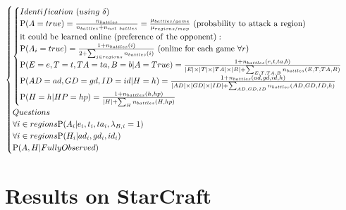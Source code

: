 \begin{eqnarray*}
\begin{cases}
\begin{cases}
    Identification\ (using\ \delta)\\
\PP(A=true)= \frac{n_{battles}}{n_{battles}+n_{not\ battles}} = \frac{\mu_{battles/game}}{\mu_{regions/map}}\ \mathrm{(probability\ to\ attack\ a\ region)}\\
\mathrm{it\ could\ be\ learned\ online\ (preference\ of\ the\ opponent):}\\
\PP(A_i=true) = \frac{1 + n_{battles}(i)}{2 + \sum_{j \in regions}n_{battles}(i)}\ \mathrm{(online\ for\ each\ game\ }\forall r\mathrm{)}\\
\PP(E=e,T=t,TA=ta,B=b|A=True) = \frac{1+n_{battles}(e,t,ta,b)}{\abs{E} \times \abs{T} \times \abs{TA} \times \abs{B} + \sum_{E,T,TA,B} n_{battles}(E,T,TA,B)} \\
\PP(AD=ad,GD=gd,ID=id|H=h) = \frac{1+n_{battles}(ad,gd,id,h)}{\abs{AD} \times \abs{GD} \times \abs{ID} + \sum_{AD,GD,ID} n_{battles}(AD,GD,ID,h)} \\
\PP(H=h|HP=hp) = \frac{1 + n_{battles}(h,hp)}{\abs{H} + \sum_{H} n_{battles}(H,hp)}\\
    \end{cases}\\
Questions\\
\forall i \in regions \PP(A_i|e_i,t_i,ta_i,\lambda_{B,i}=1)\\
\forall i \in regions \PP(H_i|ad_i,gd_i,id_i) \\
\PP(A,H|FullyObserved)\\
\end{cases}
\label{bp:BayesianTactician}
\end{eqnarray*}


\section{Results on StarCraft}
\label{sec:tacticalresults}

